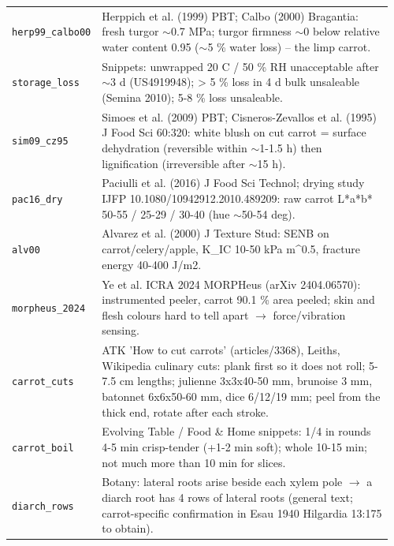\documentclass[10.5pt,a4paper]{article}
\begin{document}
{\begin{longtable}{@{}p{0.16\linewidth}p{0.8\linewidth}@{}}
\texttt{herp99\_\allowbreak{}calbo00} & Herppich et al. (1999) PBT; Calbo (2000) Bragantia: fresh turgor $\sim$0.7 MPa; turgor firmness $\sim$0 below relative water content 0.95 ($\sim$5 \% water loss) -- the limp carrot. \\
\texttt{storage\_\allowbreak{}loss} & Snippets: unwrapped 20 C / 50 \% RH unacceptable after $\sim$3 d (US4919948); > 5 \% loss in 4 d bulk unsaleable (Semina 2010); 5-8 \% loss unsaleable. \\
\texttt{sim09\_\allowbreak{}cz95} & Simoes et al. (2009) PBT; Cisneros-Zevallos et al. (1995) J Food Sci 60:320: white blush on cut carrot = surface dehydration (reversible within $\sim$1-1.5 h) then lignification (irreversible after $\sim$15 h). \\
\texttt{pac16\_\allowbreak{}dry} & Paciulli et al. (2016) J Food Sci Technol; drying study IJFP 10.1080/10942912.2010.489209: raw carrot L*a*b* 50-55 / 25-29 / 30-40 (hue $\sim$50-54 deg). \\
\texttt{alv00} & Alvarez et al. (2000) J Texture Stud: SENB on carrot/celery/apple, K\_IC 10-50 kPa m\^{}0.5, fracture energy 40-400 J/m2. \\
\texttt{morpheus\_\allowbreak{}2024} & Ye et al. ICRA 2024 MORPHeus (arXiv 2404.06570): instrumented peeler, carrot 90.1 \% area peeled; skin and flesh colours hard to tell apart $\to$ force/vibration sensing. \\
\texttt{carrot\_\allowbreak{}cuts} & ATK 'How to cut carrots' (articles/3368), Leiths, Wikipedia culinary cuts: plank first so it does not roll; 5-7.5 cm lengths; julienne 3x3x40-50 mm, brunoise 3 mm, batonnet 6x6x50-60 mm, dice 6/12/19 mm; peel from the thick end, rotate after each stroke. \\
\texttt{carrot\_\allowbreak{}boil} & Evolving Table / Food \& Home snippets: 1/4 in rounds 4-5 min crisp-tender (+1-2 min soft); whole 10-15 min; not much more than 10 min for slices. \\
\texttt{diarch\_\allowbreak{}rows} & Botany: lateral roots arise beside each xylem pole $\to$ a diarch root has 4 rows of lateral roots (general text; carrot-specific confirmation in Esau 1940 Hilgardia 13:175 to obtain). \\\bottomrule\end{longtable}}
\end{document}
